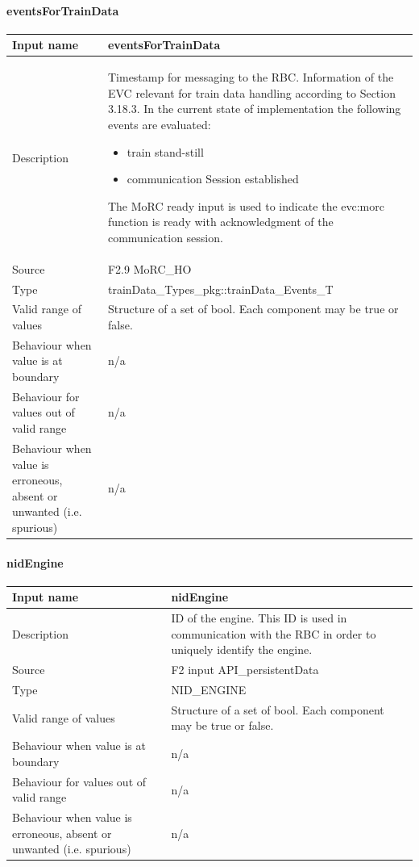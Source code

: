 \paragraph{eventsForTrainData}

\begin{longtable}{p{}p{}}
\toprule
Input name				& eventsForTrainData\\
\midrule
Description				& Timestamp for messaging to the RBC. Information of the EVC relevant for train data handling according to Section 3.18.3. In the current state of implementation the following events are evaluated:
\begin{itemize}
\item train stand-still
\item communication Session established
\end{itemize}
The MoRC ready input is used to indicate the evc:morc function is ready with acknowledgment of the communication session.\\
\midrule
Source					& F2.9 MoRC\_HO\\ 
\midrule
Type						& trainData\_Types\_pkg::trainData\_Events\_T\\
\midrule
Valid range of values	& Structure of a set of bool. Each component may be true or false.\\
\midrule
Behaviour when value is at boundary	& n/a\\
\midrule
Behaviour for values out of valid range	& n/a\\
\midrule
Behaviour when value is erroneous, absent or unwanted (i.e. spurious) & n/a\\

\bottomrule
\end{longtable}

\paragraph{nidEngine}

\begin{longtable}{p{}p{}}
\toprule
Input name				& nidEngine\\
\midrule
Description				& ID of the engine. This ID is used in communication with the RBC in order to uniquely identify the engine.\\
\midrule
Source					& F2 input API\_persistentData\\ 
\midrule
Type					& NID\_ENGINE\\
\midrule
Valid range of values	& Structure of a set of bool. Each component may be true or false.\\
\midrule
Behaviour when value is at boundary	& n/a\\
\midrule
Behaviour for values out of valid range	& n/a\\
\midrule
Behaviour when value is erroneous, absent or unwanted (i.e. spurious) & n/a\\

\bottomrule
\end{longtable}
